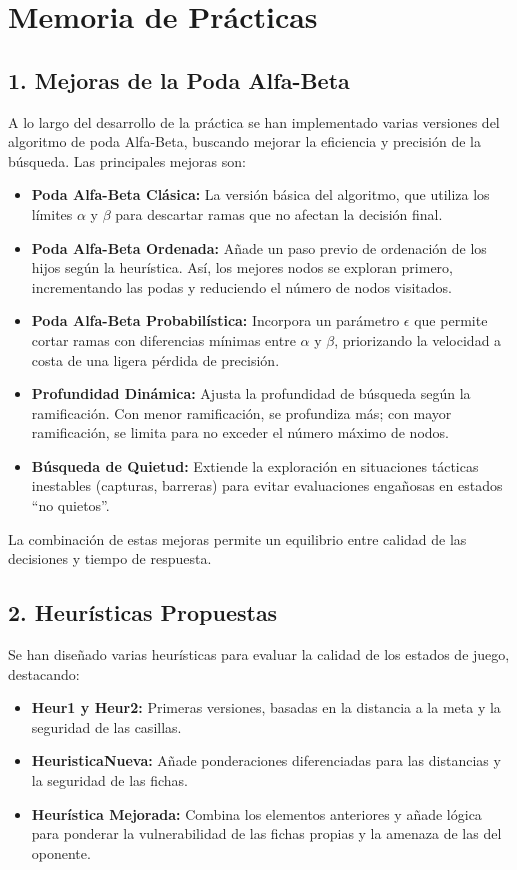 \chapter*{Memoria de Prácticas}

\section*{1. Mejoras de la Poda Alfa-Beta}
A lo largo del desarrollo de la práctica se han implementado varias versiones del algoritmo de poda Alfa-Beta, buscando mejorar la eficiencia y precisión de la búsqueda. Las principales mejoras son:

\begin{itemize}
    \item \textbf{Poda Alfa-Beta Clásica:} La versión básica del algoritmo, que utiliza los límites $\alpha$ y $\beta$ para descartar ramas que no afectan la decisión final.
    \item \textbf{Poda Alfa-Beta Ordenada:} Añade un paso previo de ordenación de los hijos según la heurística. Así, los mejores nodos se exploran primero, incrementando las podas y reduciendo el número de nodos visitados.
    \item \textbf{Poda Alfa-Beta Probabilística:} Incorpora un parámetro $\epsilon$ que permite cortar ramas con diferencias mínimas entre $\alpha$ y $\beta$, priorizando la velocidad a costa de una ligera pérdida de precisión.
    \item \textbf{Profundidad Dinámica:} Ajusta la profundidad de búsqueda según la ramificación. Con menor ramificación, se profundiza más; con mayor ramificación, se limita para no exceder el número máximo de nodos.
    \item \textbf{Búsqueda de Quietud:} Extiende la exploración en situaciones tácticas inestables (capturas, barreras) para evitar evaluaciones engañosas en estados “no quietos”.
\end{itemize}

La combinación de estas mejoras permite un equilibrio entre calidad de las decisiones y tiempo de respuesta.

\section*{2. Heurísticas Propuestas}
Se han diseñado varias heurísticas para evaluar la calidad de los estados de juego, destacando:

\begin{itemize}
    \item \textbf{Heur1 y Heur2:} Primeras versiones, basadas en la distancia a la meta y la seguridad de las casillas.
    \item \textbf{HeuristicaNueva:} Añade ponderaciones diferenciadas para las distancias y la seguridad de las fichas.
    \item \textbf{Heurística Mejorada:} Combina los elementos anteriores y añade lógica para ponderar la vulnerabilidad de las fichas propias y la amenaza de las del oponente.
\end{itemize}

